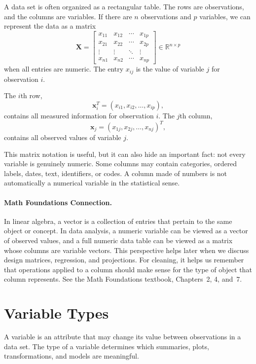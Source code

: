{A data set is often organized as a rectangular table.  The rows are observations, and the columns are variables.  If there are $n$ observations and $p$ variables, we can represent the data as a matrix
\begin{equation}
  \mathbf{X}=\begin{bmatrix}
    x_{11} & x_{12} & \cdots & x_{1p} \\
    x_{21} & x_{22} & \cdots & x_{2p} \\
    \vdots & \vdots & \ddots & \vdots \\
    x_{n1} & x_{n2} & \cdots & x_{np}
  \end{bmatrix} \in \mathbb{R}^{n\times p}
  \label{eq:ch3-data-matrix}
\end{equation}
when all entries are numeric.  The entry $x_{ij}$ is the value of variable $j$ for observation $i$.

The $i$th row,
\[
  \mathbf{x}_i^T=(x_{i1},x_{i2},\ldots,x_{ip}),
\]
contains all measured information for observation $i$.  The $j$th column,
\[
  \mathbf{x}_j=(x_{1j},x_{2j},\ldots,x_{nj})^T,
\]
contains all observed values of variable $j$.

This matrix notation is useful, but it can also hide an important fact: not every variable is genuinely numeric.  Some columns may contain categories, ordered labels, dates, text, identifiers, or codes.  A column made of numbers is not automatically a numerical variable in the statistical sense.

\paragraph{Math Foundations Connection.}
In linear algebra, a vector is a collection of entries that pertain to the same object or concept.  In data analysis, a numeric variable can be viewed as a vector of observed values, and a full numeric data table can be viewed as a matrix whose columns are variable vectors.  This perspective helps later when we discuss design matrices, regression, and projections.  For cleaning, it helps us remember that operations applied to a column should make sense for the type of object that column represents.  See the Math Foundations textbook, Chapters~2, 4, and~7.

\section{Variable Types}

A variable is an attribute that may change its value between observations in a data set.  The type of a variable determines which summaries, plots, transformations, and models are meaningful.

}

